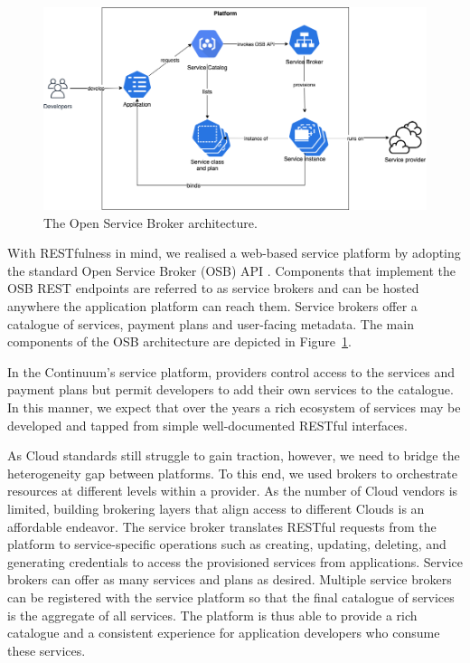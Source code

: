 \begin{figure}[ht]
\centering
\includegraphics[width=\columnwidth]{figures/osb}
\caption{The Open Service Broker architecture.} \label{fig:osb}
\end{figure}

With RESTfulness in mind, we realised a web-based service platform by adopting the standard Open Service Broker (OSB) API \cite{osb}. Components that implement the OSB REST endpoints are referred to as service brokers and can be hosted anywhere the application platform can reach them. Service brokers offer a catalogue of services, payment plans and user-facing metadata. The main components of the OSB architecture are depicted in Figure~\ref{fig:osb}.

In the Continuum's service platform, providers control access to the services and payment plans but permit developers to add their own services to the catalogue. In this manner, we expect that over the years a rich ecosystem of services may be developed and tapped from simple well-documented RESTful interfaces.

As Cloud standards still struggle to gain traction, however, we need to bridge the heterogeneity gap between platforms. 
To this end, we used brokers to orchestrate resources at different levels within a provider. As the number of Cloud vendors is limited, building brokering layers that align access to different Clouds is an affordable endeavor. The service broker translates RESTful requests from the platform to service-specific operations such as creating, updating, deleting, and generating credentials to access the provisioned services from applications. Service brokers can offer as many services and plans as desired. Multiple service brokers can be registered with the service platform so that the final catalogue of services is the aggregate of all services. The platform is thus able to provide a rich catalogue and a consistent experience for application developers who consume these services.

